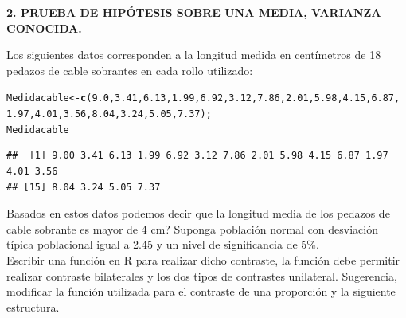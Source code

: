 \documentclass[12pt,letterpaper]{article}\usepackage[]{graphicx}\usepackage[]{color}
\makeatletter
\newcommand{\hlnum}[1]{\textcolor[rgb]{0.686,0.059,0.569}{#1}}%
\newcommand{\hlstd}[1]{\textcolor[rgb]{0.345,0.345,0.345}{#1}}%
\newcommand{\hlkwb}[1]{\textcolor[rgb]{0.69,0.353,0.396}{#1}}%
\newcommand{\hlkwd}[1]{\textcolor[rgb]{0.737,0.353,0.396}{\textbf{#1}}}%
\newenvironment{kframe}{%
 \def\at@end@of@kframe{}%
 \ifinner\ifhmode%
  \def\at@end@of@kframe{\end{minipage}}%
  \begin{minipage}{\columnwidth}%
 \fi\fi%
 \def\FrameCommand##1{\hskip\@totalleftmargin \hskip-\fboxsep
 \colorbox{shadecolor}{##1}\hskip-\fboxsep
     \hskip-\linewidth \hskip-\@totalleftmargin \hskip\columnwidth}%
 \MakeFramed {\advance\hsize-\width
   \@totalleftmargin\z@ \linewidth\hsize
   \@setminipage}}%
 {\par\unskip\endMakeFramed%
 \at@end@of@kframe}
\newenvironment{knitrout}{}{} %
\makeatother
\begin{document}
\begin{center}
\textbf{2.  PRUEBA DE HIP\'OTESIS SOBRE UNA MEDIA, VARIANZA CONOCIDA.}
\end{center}

Los siguientes datos corresponden a la longitud medida en cent\'imetros de 18 pedazos de cable sobrantes en cada rollo utilizado:
\begin{knitrout}
\color{fgcolor}\begin{kframe}
\begin{alltt}
\hlstd{Medidacable} \hlkwb{<-} \hlkwd{c}\hlstd{(}\hlnum{9.0}\hlstd{,} \hlnum{3.41}\hlstd{,} \hlnum{6.13}\hlstd{,} \hlnum{1.99}\hlstd{,} \hlnum{6.92}\hlstd{,} \hlnum{3.12}\hlstd{,} \hlnum{7.86}\hlstd{,} \hlnum{2.01}\hlstd{,} \hlnum{5.98}\hlstd{,} \hlnum{4.15}\hlstd{,} \hlnum{6.87}\hlstd{,}
                 \hlnum{1.97}\hlstd{,} \hlnum{4.01}\hlstd{,} \hlnum{3.56}\hlstd{,} \hlnum{8.04}\hlstd{,} \hlnum{3.24}\hlstd{,} \hlnum{5.05}\hlstd{,} \hlnum{7.37}\hlstd{);}
\hlstd{Medidacable}
\end{alltt}
\begin{verbatim}
##  [1] 9.00 3.41 6.13 1.99 6.92 3.12 7.86 2.01 5.98 4.15 6.87 1.97 4.01 3.56
## [15] 8.04 3.24 5.05 7.37
\end{verbatim}
\end{kframe}
\end{knitrout}

Basados en estos datos \¿podemos decir que la longitud media de los pedazos de cable sobrante es mayor de 4 cm? Suponga poblaci\'on normal con desviaci\'on t\'ipica poblacional igual a 2.45 y un nivel de significancia de 5\%.\\

Escribir una funci\'on en R para realizar dicho contraste, la funci\'on debe permitir realizar contraste bilaterales y los dos tipos de contrastes unilateral. Sugerencia, modificar la funci\'on utilizada para el contraste de una proporci\'on y la siguiente estructura.\\
\end{document}
